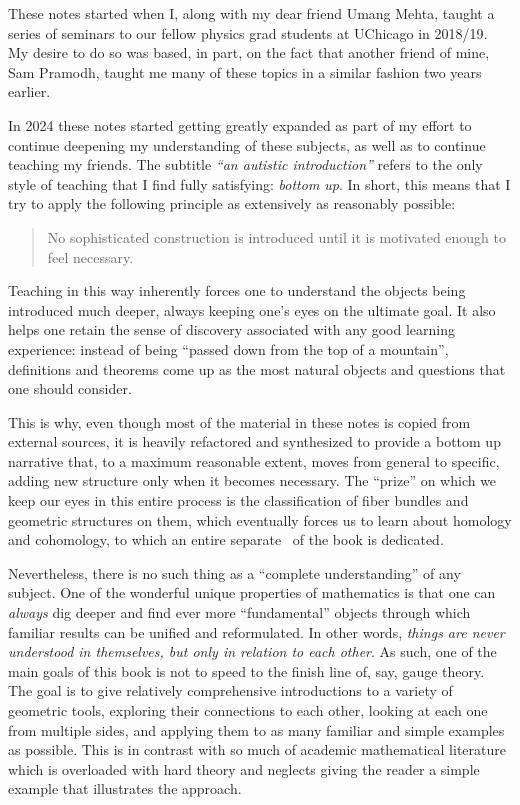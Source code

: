 
These notes started when I, along with my dear friend Umang Mehta, taught a series of seminars to our fellow physics grad students at UChicago in 2018/19. My desire to do so was based, in part, on the fact that another friend of mine, Sam Pramodh, taught me many of these topics in a similar fashion two years earlier.

In 2024 these notes started getting greatly expanded as part of my effort to continue deepening my understanding of these subjects, as well as to continue teaching my friends. The subtitle \emph{``an autistic introduction''} refers to the only style of teaching that I find fully satisfying: \emph{bottom up}. In short, this means that I try to apply the following principle as extensively as reasonably possible:
\begin{quote}
    No sophisticated construction is introduced until it is motivated enough to feel necessary.
\end{quote}
Teaching in this way inherently forces one to understand the objects being introduced much deeper, always keeping one's eyes on the ultimate goal. It also helps one retain the sense of discovery associated with any good learning experience: instead of being ``passed down from the top of a mountain'', definitions and theorems come up as the most natural objects and questions that one should consider. 

This is why, even though most of the material in these notes is copied from external sources, it is heavily refactored and synthesized to provide a bottom up narrative that, to a maximum reasonable extent, moves from general to specific, adding new structure only when it becomes necessary. The ``prize'' on which we keep our eyes in this entire process is the classification of fiber bundles and geometric structures on them, which eventually forces us to learn about homology and cohomology, to which an entire separate \partt\ of the book is dedicated. 

Nevertheless, there is no such thing as a ``complete understanding'' of any subject. One of the wonderful unique properties of mathematics is that one can \emph{always} dig deeper and find ever more ``fundamental'' objects through which familiar results can be unified and reformulated. In other words, \emph{things are never understood in themselves, but only in relation to each other}. As such, one of the main goals of this book is not to speed to the finish line of, say, gauge theory. The goal is to give relatively comprehensive introductions to a variety of geometric tools, exploring their connections to each other, looking at each one from multiple sides, and applying them to as many familiar and simple examples as possible. This is in contrast with so much of academic mathematical literature which is overloaded with hard theory and neglects giving the reader a simple example that illustrates the approach.

